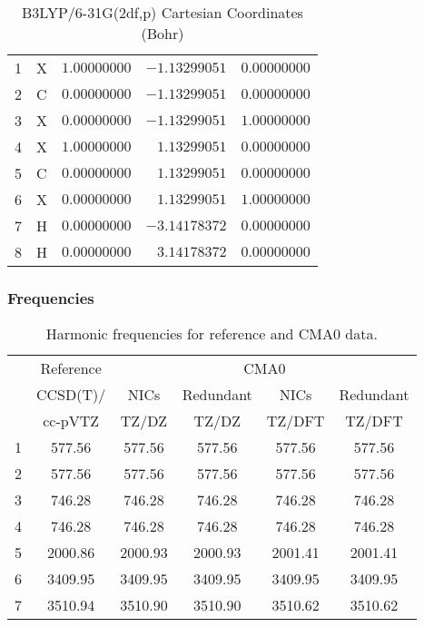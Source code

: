 \documentclass[10pt,oneside]{article}
\begin{document}
\begin{table}[h]
\centering
\caption{B3LYP/6-31G(2df,p) Cartesian Coordinates (Bohr)}
\begin{tabular}{llrrr}
\toprule
1  & X  & $ 1.00000000$ & $-1.13299051$ & $ 0.00000000$ \\
2  & C  & $ 0.00000000$ & $-1.13299051$ & $ 0.00000000$ \\
3  & X  & $ 0.00000000$ & $-1.13299051$ & $ 1.00000000$ \\
4  & X  & $ 1.00000000$ & $ 1.13299051$ & $ 0.00000000$ \\
5  & C  & $ 0.00000000$ & $ 1.13299051$ & $ 0.00000000$ \\
6  & X  & $ 0.00000000$ & $ 1.13299051$ & $ 1.00000000$ \\
7  & H  & $ 0.00000000$ & $-3.14178372$ & $ 0.00000000$ \\
8  & H  & $ 0.00000000$ & $ 3.14178372$ & $ 0.00000000$ \\
\bottomrule
\end{tabular}
\end{table}

\begin{table}[h!]
\subsubsection*{Frequencies}
\centering
\caption{Harmonic frequencies for reference and CMA0 data.}
\begin{tabular}{cccccc}
\toprule
{} & Reference & \multicolumn{4}{c}{CMA0} \\
{} &  CCSD(T)/ &    NICs &  Redundant &    NICs & Redundant \\
{} &   cc-pVTZ &   TZ/DZ &      TZ/DZ &  TZ/DFT &    TZ/DFT \\
\midrule
1 &    577.56 &  577.56 &     577.56 &  577.56 &    577.56 \\
2 &    577.56 &  577.56 &     577.56 &  577.56 &    577.56 \\
3 &    746.28 &  746.28 &     746.28 &  746.28 &    746.28 \\
4 &    746.28 &  746.28 &     746.28 &  746.28 &    746.28 \\
5 &   2000.86 & 2000.93 &    2000.93 & 2001.41 &   2001.41 \\
6 &   3409.95 & 3409.95 &    3409.95 & 3409.95 &   3409.95 \\
7 &   3510.94 & 3510.90 &    3510.90 & 3510.62 &   3510.62 \\
\bottomrule
\end{tabular}
\end{table}
\end{document}
